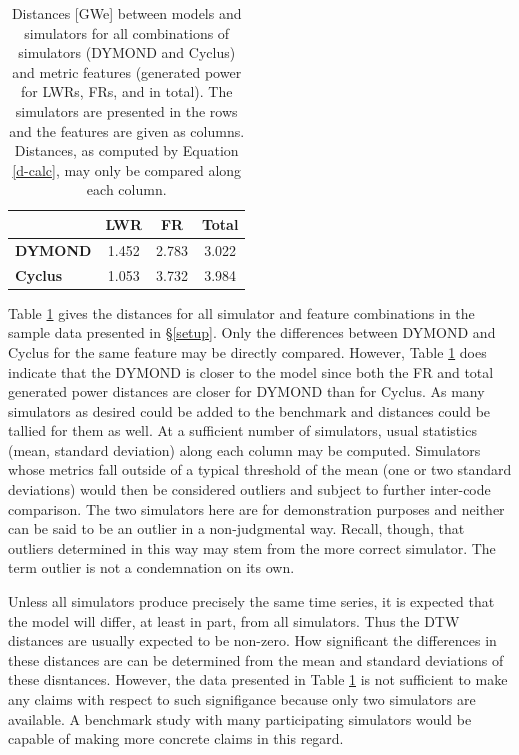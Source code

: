 \begin{table}[htb]
\centering
\caption{Distances [GWe] between models and simulators for all combinations of 
simulators (DYMOND and Cyclus) and metric features (generated power for 
LWRs, FRs, and in total). The simulators are presented in the rows and the
features are given as columns. Distances, as computed by 
Equation \ref{d-calc}, may only be compared along each column.}
\label{d-compare}
\begin{tabular}{l||c||c||c|}
                & \textbf{LWR} & \textbf{FR} & \textbf{Total} \\
\hline
\textbf{DYMOND} & 1.452        & 2.783       & 3.022          \\
\hline
\textbf{Cyclus} & 1.053        & 3.732       & 3.984          \\
\hline
\end{tabular}
\end{table}

Table \ref{d-compare} gives the distances for all simulator and feature 
combinations in the sample data presented in \S\ref{setup}. Only the differences between DYMOND and 
Cyclus for the same feature may be directly compared.  However, Table \ref{d-compare} 
does indicate that the DYMOND is closer to the model since both the FR and total
generated power distances are closer for DYMOND than for Cyclus.  As many
simulators as desired could be added to the benchmark and distances could 
be tallied for them as well. At a sufficient number of simulators, usual 
statistics (mean, standard deviation) along each column may be computed.
Simulators whose metrics fall outside of a typical threshold of the mean
(one or two standard deviations) would then be considered outliers and 
subject to further inter-code comparison. The two simulators here are 
for demonstration purposes and neither can be said to be an outlier in a
non-judgmental way. Recall, though, that outliers determined in this way 
may stem from the more correct simulator. The term outlier is not a 
condemnation on its own.

Unless all simulators produce precisely the same time series, it is 
expected that the model will differ, at least in part, from all simulators.
Thus the DTW distances are usually expected to be non-zero. How significant
the differences in these distances are can be determined from the mean
and standard deviations of these disntances.  However, the data presented
in Table \ref{d-compare} is not sufficient to make any claims with respect
to such signifigance because only two simulators are available. A benchmark 
study with many participating simulators would be capable of making more 
concrete claims in this regard.

